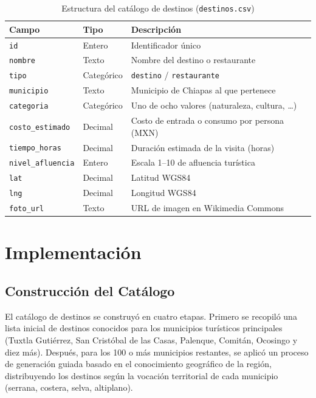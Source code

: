 \documentclass[12pt,letterpaper]{report}
\begin{document}
\begin{table}[H]
\centering
\caption{Estructura del catálogo de destinos (\texttt{destinos.csv})}
\label{tab:csv}
\begin{tabular}{lll}
\toprule
\textbf{Campo} & \textbf{Tipo} & \textbf{Descripción} \\
\midrule
\texttt{id}              & Entero    & Identificador único \\
\texttt{nombre}          & Texto     & Nombre del destino o restaurante \\
\texttt{tipo}            & Categórico & \texttt{destino} / \texttt{restaurante} \\
\texttt{municipio}       & Texto     & Municipio de Chiapas al que pertenece \\
\texttt{categoria}       & Categórico & Uno de ocho valores (naturaleza, cultura, …) \\
\texttt{costo\_estimado} & Decimal   & Costo de entrada o consumo por persona (MXN) \\
\texttt{tiempo\_horas}   & Decimal   & Duración estimada de la visita (horas) \\
\texttt{nivel\_afluencia} & Entero   & Escala 1–10 de afluencia turística \\
\texttt{lat}             & Decimal   & Latitud WGS84 \\
\texttt{lng}             & Decimal   & Longitud WGS84 \\
\texttt{foto\_url}       & Texto     & URL de imagen en Wikimedia Commons \\
\bottomrule
\end{tabular}
\end{table}

\section{Implementación}

\subsection{Construcción del Catálogo}

El catálogo de destinos se construyó en cuatro etapas. Primero se recopiló una lista inicial
de destinos conocidos para los municipios turísticos principales (Tuxtla Gutiérrez, San
Cristóbal de las Casas, Palenque, Comitán, Ocosingo y diez más). Después, para los 100 o
más municipios restantes, se aplicó un proceso de generación guiada basado en el conocimiento
geográfico de la región, distribuyendo los destinos según la vocación territorial de cada
municipio (serrana, costera, selva, altiplano).
\end{document}
